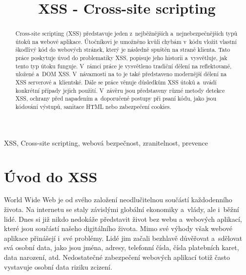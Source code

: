 \documentclass[11pt, conference, a4paper]{IEEEtran}
\begin{document}
\title{XSS \-- Cross\--site scripting}

\author{
}
\maketitle

\begin{abstract}
Cross-site scripting (XSS) představuje jeden z~nejběžnějších a~nejnebezpečnějších typů útoků na webové aplikace. Útočníkovi je umožněno kvůli chybám v~kódu vložit vlastní škodlivý kód do webových stránek, který je následně spuštěn na straně klienta. Tato práce poskytuje úvod do problematiky XSS, popisuje jeho historii a~vysvětluje, jak tento typ útoku funguje. V~rámci práce je vysvětleno tradiční dělení na reflektované, uložené a~DOM XSS. V~návaznosti na to je také představeno modernější dělení na XSS serverové a~klientské. Dále se práce věnuje důsledkům XSS útoků a~uvádí konkrétní případy jejich použití. V~závěru jsou představeny různé metody detekce XSS, ochrany před napadením a~doporučené postupy při psaní kódu, jako jsou kódování výstupů, sanitace HTML nebo zabezpečení cookies.
\end{abstract}

\begin{IEEEkeywords}
XSS, Cross-site scripting, webová bezpečnost, zranitelnost, prevence
\end{IEEEkeywords}

\section{Úvod do XSS}

World Wide Web je od svého založení neodlučitelnou součástí každodenního života. Na internetu se staly závislými globální ekonomiky a~vlády, ale i~běžní lidé. Dnes si již nikdo nedokáže představit život bez webu a~webových aplikací, které jsou součástí našeho digitálního života. Mimo své výhody však webové aplikace přinášejí i~své problémy. Lidé jim začali bezhlavě důvěřovat a~sdělovat svá osobní data, jako jsou jména, adresy, telefonní čísla, čísla platebních karet, data narození, atd. Nedostatečné zabezpečení webových aplikací totiž často vystavuje osobní data riziku zcizení. 
\end{document}
